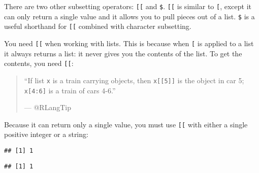 There are two other subsetting operators: \texttt{{[}{[}} and
\texttt{\$}. \texttt{{[}{[}} is similar to \texttt{{[}}, except it can
only return a single value and it allows you to pull pieces out of a
list. \texttt{\$} is a useful shorthand for \texttt{{[}{[}} combined
with character subsetting. \indexc{[[} \indexc{\$}

You need \texttt{{[}{[}} when working with lists. This is because when
\texttt{{[}} is applied to a list it always returns a list: it never
gives you the contents of the list. To get the contents, you need
\texttt{{[}{[}}:

\begin{quote}
``If list \texttt{x} is a train carrying objects, then
\texttt{x{[}{[}5{]}{]}} is the object in car 5; \texttt{x{[}4:6{]}} is a
train of cars 4-6.''

--- @RLangTip
\end{quote}

Because it can return only a single value, you must use \texttt{{[}{[}}
with either a single positive integer or a string:
 

\begin{Shaded}
\begin{Highlighting}[]
\StringTok{ }\NormalTok{(} \NormalTok{, } \NormalTok{)}
\NormalTok{a[[}\NormalTok{]]}
\end{Highlighting}
\end{Shaded}

\begin{verbatim}
## [1] 1
\end{verbatim}

\begin{Shaded}
\begin{Highlighting}[]
\NormalTok{a[[}\NormalTok{]]}
\end{Highlighting}
\end{Shaded}

\begin{verbatim}
## [1] 1
\end{verbatim}

\begin{Shaded}
\begin{Highlighting}[]
\StringTok{ }\NormalTok{(} \NormalTok{(} \NormalTok{(} \NormalTok{(} \NormalTok{))))}
\NormalTok{b[[}\NormalTok{(}\NormalTok{, }\NormalTok{, }\NormalTok{, }\NormalTok{)]]}
\end{Highlighting}
\end{Shaded}

